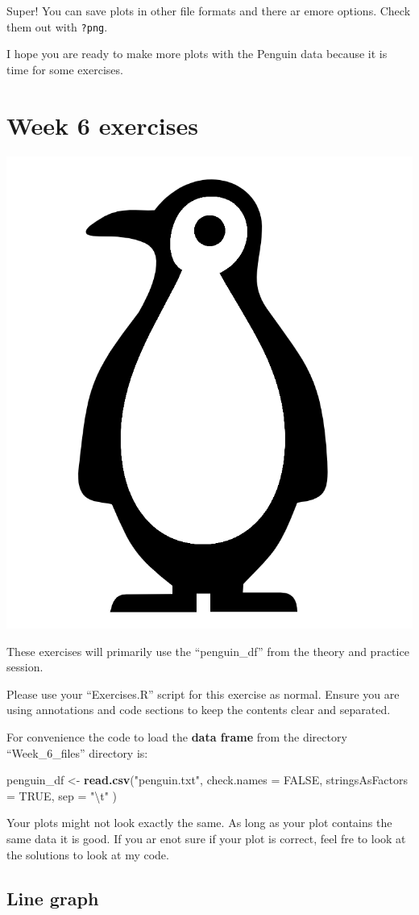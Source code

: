 \documentclass[]{book}
\newenvironment{Shaded}{\begin{snugshade}}{\end{snugshade}}
\newcommand{\KeywordTok}[1]{\textcolor[rgb]{0.13,0.29,0.53}{\textbf{#1}}}
\newcommand{\DataTypeTok}[1]{\textcolor[rgb]{0.13,0.29,0.53}{#1}}
\newcommand{\CharTok}[1]{\textcolor[rgb]{0.31,0.60,0.02}{#1}}
\newcommand{\StringTok}[1]{\textcolor[rgb]{0.31,0.60,0.02}{#1}}
\newcommand{\OtherTok}[1]{\textcolor[rgb]{0.56,0.35,0.01}{#1}}
\newcommand{\NormalTok}[1]{#1}
\begin{document}
Super! You can save plots in other file formats and there ar emore
options. Check them out with \texttt{?png}.

I hope you are ready to make more plots with the Penguin data because it
is time for some exercises.

\chapter{Week 6 exercises}\label{week-6-exercises}

\begin{center}\includegraphics[width=0.2\linewidth]{figures/penguin} \end{center}

These exercises will primarily use the ``penguin\_df'' from the theory
and practice session.

Please use your ``Exercises.R'' script for this exercise as normal.
Ensure you are using annotations and code sections to keep the contents
clear and separated.

For convenience the code to load the \textbf{data frame} from the
directory ``Week\_6\_files'' directory is:

\begin{Shaded}
\begin{Highlighting}[]
\NormalTok{penguin_df <-}\StringTok{ }\KeywordTok{read.csv}\NormalTok{(}\StringTok{"penguin.txt"}\NormalTok{, }
                      \DataTypeTok{check.names =} \OtherTok{FALSE}\NormalTok{,}
                      \DataTypeTok{stringsAsFactors =} \OtherTok{TRUE}\NormalTok{,}
                      \DataTypeTok{sep =} \StringTok{"}\CharTok{\textbackslash{}t}\StringTok{"}
\NormalTok{                      )}
\end{Highlighting}
\end{Shaded}

Your plots might not look exactly the same. As long as your plot
contains the same data it is good. If you ar enot sure if your plot is
correct, feel fre to look at the solutions to look at my code.

\section{Line graph}\label{line-graph}
\end{document}
